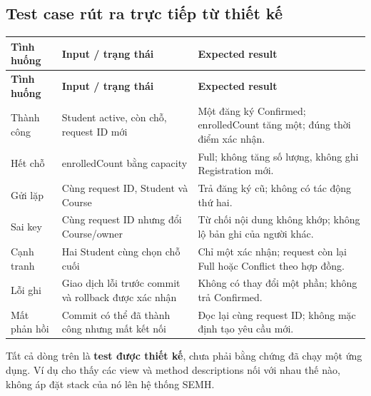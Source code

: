 \subsection{Test case rút ra trực tiếp từ thiết kế}
\begin{longtable}{|L{23mm}|L{58mm}|L{59mm}|}\hline
\textbf{Tình huống} & \textbf{Input / trạng thái} & \textbf{Expected result}\\\hline
\endfirsthead
\hline
\textbf{Tình huống} & \textbf{Input / trạng thái} & \textbf{Expected result}\\\hline
\endhead
Thành công & Student active, còn chỗ, request ID mới & Một đăng ký Confirmed; enrolledCount tăng một; đúng thời điểm xác nhận.\\\hline
Hết chỗ & enrolledCount bằng capacity & Full; không tăng số lượng, không ghi Registration mới.\\\hline
Gửi lặp & Cùng request ID, Student và Course & Trả đăng ký cũ; không có tác động thứ hai.\\\hline
Sai key & Cùng request ID nhưng đổi Course/owner & Từ chối nội dung không khớp; không lộ bản ghi của người khác.\\\hline
Cạnh tranh & Hai Student cùng chọn chỗ cuối & Chỉ một xác nhận; request còn lại Full hoặc Conflict theo hợp đồng.\\\hline
Lỗi ghi & Giao dịch lỗi trước commit và rollback được xác nhận & Không có thay đổi một phần; không trả Confirmed.\\\hline
Mất phản hồi & Commit có thể đã thành công nhưng mất kết nối & Đọc lại cùng request ID; không mặc định tạo yêu cầu mới.\\\hline
\end{longtable}
Tất cả dòng trên là \textbf{test được thiết kế}, chưa phải bằng chứng đã chạy một ứng dụng. Ví dụ cho thấy các view và method descriptions nối với nhau thế nào, không áp đặt stack của nó lên hệ thống SEMH.
